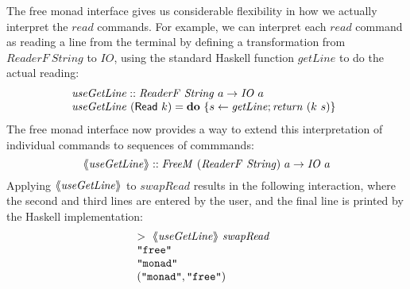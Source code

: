 \documentclass{jfp1}
\newcommand{\fmext}[1]{\langle\kern-0.25em\langle #1 \rangle\kern-0.25em\rangle}
\newcommand{\kw}[1]{\textbf{#1}}
\begin{document}
The free monad interface gives us considerable flexibility in how we
actually interpret the $\mathit{read}$ commands. For example, we can
interpret each $\mathit{read}$ command as reading a line from the
terminal by defining a transformation from
$\mathit{ReaderF}~\mathit{String}$ to $\mathit{IO}$, using the
standard Haskell function $\mathit{getLine}$ to do the actual reading:
\begin{displaymath}
  \begin{array}{@{}l}
    \mathit{useGetLine} :: \mathit{ReaderF}~\mathit{String}~a \to \mathit{IO}~a \\
    \mathit{useGetLine}~(\mathsf{Read}~k) = \kw{do}~\{ s \leftarrow \mathit{getLine}; \mathit{return}~(k~s) \}
  \end{array}
\end{displaymath}
The free monad interface now provides a way to extend this
interpretation of individual commands to sequences of commmands:
\begin{displaymath}
  \fmext{\mathit{useGetLine}} :: \mathit{FreeM}~(\mathit{ReaderF}~\mathit{String})~a \to \mathit{IO}~a
\end{displaymath}
Applying $\fmext{\mathit{useGetLine}}$ to $\mathit{swapRead}$ results
in the following interaction, where the second and third lines are
entered by the user, and the final line is printed by the Haskell
implementation:
\begin{displaymath}
  \begin{array}{@{}l}
    >~\fmext{\mathit{useGetLine}}~\mathit{swapRead} \\
    \texttt{"free"} \\
    \texttt{"monad"} \\
    (\texttt{"monad"}, \texttt{"free"})
  \end{array}
\end{displaymath}
\end{document}
